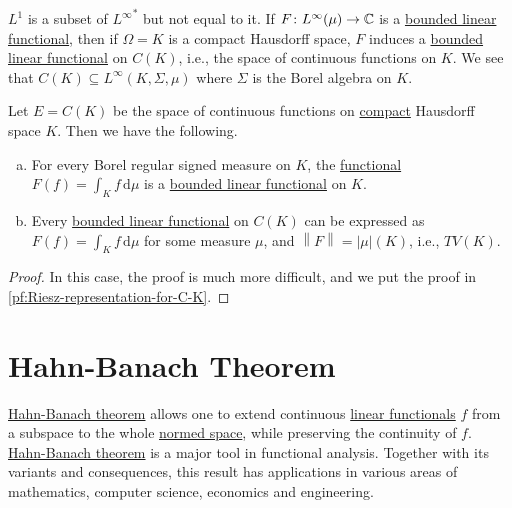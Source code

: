 \begin{remark}
	\(L^1\) is a subset of \({L^{\infty}}^{\ast}\) but not equal to it. If \(F\colon L^{\infty} (\mu )\to \mathbb{\MakeUppercase{c}} \) is a \hyperref[def:bounded-linear-functional]{bounded linear functional}, then if \(\Omega = K\) is a compact Hausdorff space, \(F\) induces a \hyperref[def:bounded-linear-functional]{bounded linear functional} on \(C(K)\), i.e., the space of continuous functions on \(K\). We see that \(C(K)\subseteq L^{\infty} (K, \Sigma , \mu )\) where \(\Sigma \) is the Borel algebra on \(K\).
\end{remark}

\begin{theorem}\label{thm:Riesz-representation-for-C-K}
	Let \(E = C(K)\) be the space of continuous functions on \hyperref[def:compact]{compact} Hausdorff space \(K\). Then we have the following.
	\begin{enumerate}[(a)]
		\item For every Borel regular signed measure on \(K\), the \hyperref[def:linear-functional]{functional} \(F(f) = \int _K f\,\mathrm{d} \mu \) is a \hyperref[def:bounded-linear-functional]{bounded linear functional} on \(K\).
		\item Every \hyperref[def:bounded-linear-functional]{bounded linear functional} on \(C(K)\) can be expressed as \(F(f) = \int _K f\,\mathrm{d} \mu \) for some measure \(\mu \), and \(\left\lVert F\right\rVert = \left\vert \mu  \right\vert (K) \), i.e., \(TV(K)\).
	\end{enumerate}
\end{theorem}
\begin{proof}
	In this case, the proof is much more difficult, and we put the proof in \autoref{pf:Riesz-representation-for-C-K}.
\end{proof}

\section{Hahn-Banach Theorem}
\hyperref[thm:Hahn-Banach]{Hahn-Banach theorem} allows one to extend continuous \hyperref[def:linear-functional]{linear functionals} \(f\) from a subspace to the whole \hyperref[def:normed-vector-space]{normed space}, while preserving the continuity of \(f\). \hyperref[thm:Hahn-Banach]{Hahn-Banach theorem} is a major tool in functional analysis. Together with its variants and consequences, this result has applications in various areas of mathematics, computer science, economics and engineering.

